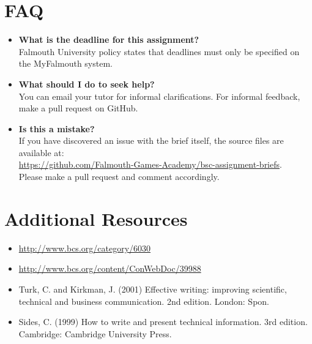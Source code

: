 \documentclass{../fal_assignment}
\begin{document}
\section*{FAQ}

\begin{itemize}
	\item 	\textbf{What is the deadline for this assignment?} \\ 
    		Falmouth University policy states that deadlines must only be specified on the MyFalmouth system.
    		
	\item 	\textbf{What should I do to seek help?} \\ 
    		You can email your tutor for informal clarifications. For informal feedback, make a pull request on GitHub. 
    		
    	\item 	\textbf{Is this a mistake?} \\ 	
    		If you have discovered an issue with the brief itself, the source files are available at: \\
    		\url{https://github.com/Falmouth-Games-Academy/bsc-assignment-briefs}.\\
    		 Please make a pull request and comment accordingly.
\end{itemize}

\section*{Additional Resources}

\begin{itemize}
   \item \url{http://www.bcs.org/category/6030}
   \item \url{http://www.bcs.org/content/ConWebDoc/39988}
   \item Turk, C. and Kirkman, J. (2001) Effective writing: improving scientific, technical and business communication. 2nd edition. London: Spon.
   \item Sides, C. (1999) How to write and present technical information. 3rd edition. Cambridge: Cambridge University Press.
   
   
\end{itemize}

\rubricyearthree
{}
	
\end{document}
